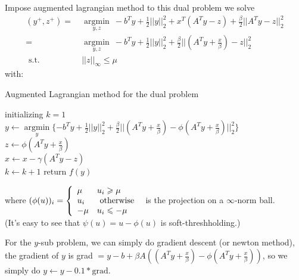 \documentclass[11pt, oneside]{article}   	%
\begin{document}
Impose augmented lagrangian method to this dual problem we solve 
\begin{align}
\left( y ^ { + } , z^ { + } \right) =& \ \underset { y , z } { \operatorname { argmin } } \  -b^Ty+\frac{1}{2}||y||^2_2 +x^T( A^Ty-z ) + \frac { \beta} { 2 } || A^Ty-z || ^ { 2 } _2\\
=& \ \underset { y , z } { \operatorname { argmin } } \  -b^Ty+\frac{1}{2}||y||^2_2 + \frac { \beta} { 2 } || (A^Ty+\frac{x}{\beta})-z || ^ { 2 } _2\\
\text { s.t. } & \ ||z||_{\infty}\le\mu
\end{align}
with:\\
\begin{algorithm}[H]
  \SetAlgoNoLine
  \caption{Augmented Lagrangian method for the dual problem} 
  initializing $k = 1$\\
  {  
  $y\gets \underset { y } { \operatorname { argmin } } \{-b^Ty+\frac{1}{2}||y||^2_2 +   \frac{\beta}{2}|| (A^Ty+\frac{x}{\beta}) - \phi(A^Ty+\frac{x}{\beta})||^2_2\}$\\
  $z \gets \phi(A^Ty+\frac{x}{\beta})$\\
  $ x\gets x - \gamma (A^Ty-z)$\\
   $k\gets k+1$
  }
  return $f(y)$
\end{algorithm}
where $(\phi ( u ))_i = \left\{ \begin{array} { l l } { \mu } & { u _ { i } \geqslant \mu } \\ { u _ { i } } & { \text { otherwise } } \\ { - \mu } & { u _ { i } \leqslant - \mu } \end{array} \right.$ 
is the projection on a $\infty$-norm ball.\\
(It's easy to see that $\psi(u)=u-\phi(u)$ is soft-threshholding.)

For the $y$-sub problem, we can simply do gradient descent (or newton method), the gradient of $y$ is grad $= y - b + \beta A((A^Ty+\frac{x}{\beta}) - \phi(A^Ty+\frac{x}{\beta}))$, so we simply do $y\gets y - 0.1*\textrm{grad}$.
 
\end{document}
